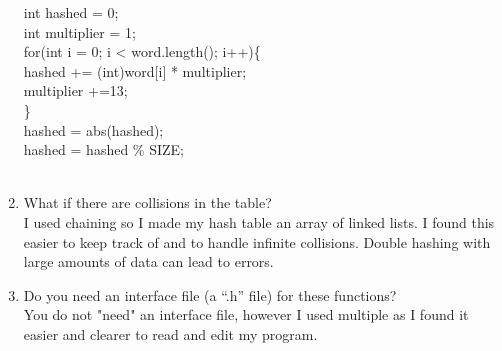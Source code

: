 \documentclass[11pt]{article} %
\begin{document}
\begin{enumerate}
       	int hashed = 0;\\
        int multiplier = 1;\\
        for(int i = 0; i < word.length(); i++)\{\\
            hashed += (int)word[i] * multiplier;\\
            multiplier +=13;\\
        \}\\
        hashed = abs(hashed);\\
        hashed = hashed \% SIZE;\\\\
\item  What if there are collisions in the table?\\

I used chaining so I made my hash table an array of linked lists. I found this easier to keep track of and to handle infinite collisions. Double hashing with large amounts of data can lead to errors.\\

\item  Do you need an interface file (a “.h” file) for these functions? \\

You do not "need" an interface file, however I used multiple as I found it easier and clearer to read and edit my program.\\

\end{enumerate}
\end{document}
